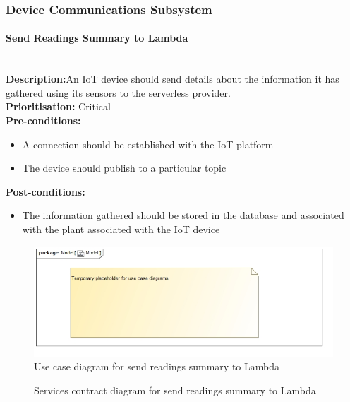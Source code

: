 \documentclass{article}
\begin{document}
\subsubsection{Device Communications Subsystem}
	\paragraph{Send Readings Summary to Lambda}\mbox{}\\
		\textbf{Description:}An IoT device should send details about the information it has gathered using its sensors to the serverless provider.\\
		\textbf{Prioritisation:} Critical\\		
		\textbf{Pre-conditions:}
			\begin{itemize}
				\item A connection should be established with the IoT platform
				\item The device should publish to a particular topic
			\end{itemize}
		\textbf{Post-conditions:}
			\begin{itemize}
				\item The information gathered should be stored in the database and associated with the plant associated with the IoT device
			\end{itemize}

		\begin{figure}[H]
			\includegraphics[width=\linewidth]{images/tempUseCase.jpg}
			\caption{Use case diagram for send readings summary to Lambda}
		\end{figure}
		
		\begin{figure}[H]
			\caption{Services contract diagram for send readings summary to Lambda}
		\end{figure}
		
\end{document}
